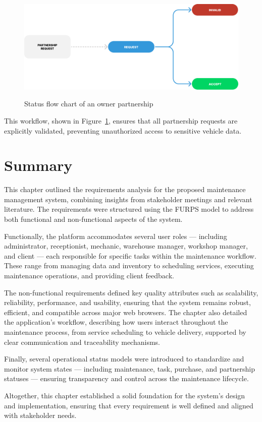 \begin{figure}[h]
  \caption{Status flow chart of an owner partnership}
  \centering
  \includegraphics[width=\textwidth]{figs/Status/OwnerPartnership_StatusDiagram}
  \label{fig:ownerPartnershipFlowChart}
\end{figure}

This workflow, shown in Figure~\ref{fig:ownerPartnershipFlowChart}, ensures that all partnership requests are explicitly validated, preventing unauthorized access to sensitive vehicle data.





\section{Summary}


This chapter outlined the requirements analysis for the proposed maintenance management system, combining insights from stakeholder meetings and relevant literature. The requirements were structured using the FURPS model to address both functional and non-functional aspects of the system.

Functionally, the platform accommodates several user roles — including administrator, receptionist, mechanic, warehouse manager, workshop manager, and client — each responsible for specific tasks within the maintenance workflow. These range from managing data and inventory to scheduling services, executing maintenance operations, and providing client feedback.

The non-functional requirements defined key quality attributes such as scalability, reliability, performance, and usability, ensuring that the system remains robust, efficient, and compatible across major web browsers. The chapter also detailed the application’s workflow, describing how users interact throughout the maintenance process, from service scheduling to vehicle delivery, supported by clear communication and traceability mechanisms.

Finally, several operational status models were introduced to standardize and monitor system states — including maintenance, task, purchase, and partnership statuses — ensuring transparency and control across the maintenance lifecycle.

Altogether, this chapter established a solid foundation for the system’s design and implementation, ensuring that every requirement is well defined and aligned with stakeholder needs.